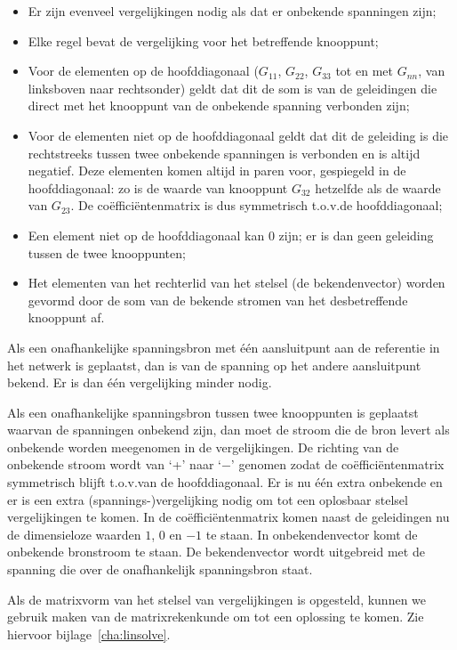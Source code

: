 \begin{itemize}
\item Er zijn evenveel vergelijkingen nodig als dat er onbekende spanningen zijn;
\item Elke regel bevat de vergelijking voor het betreffende knooppunt;
\item Voor de elementen op de hoofddiagonaal ($G_{11}$, $G_{22}$, $G_{33}$ tot en met $G_{nn}$, van linksboven naar rechtsonder) geldt dat dit de som is van de geleidingen die direct met het knooppunt van de onbekende spanning verbonden zijn;
\item Voor de elementen niet op de hoofddiagonaal geldt dat dit de geleiding is die rechtstreeks tussen twee onbekende spanningen is verbonden en is altijd negatief. Deze elementen komen altijd in paren voor, gespiegeld in de hoofddiagonaal: zo is de waarde van knooppunt $G_{32}$ hetzelfde als de waarde van $G_{23}$. De coëfficiëntenmatrix is dus symmetrisch t.o.v.\@ de hoofddiagonaal;
\item Een element niet op de hoofddiagonaal kan 0 zijn; er is dan geen geleiding tussen de twee knooppunten;
\item Het elementen van het rechterlid van het stelsel (de bekendenvector) worden gevormd door de som van de bekende stromen van het desbetreffende knooppunt af.
\end{itemize}

Als een onafhankelijke spanningsbron met één aansluitpunt aan de referentie in het netwerk is geplaatst, dan is van de spanning op het andere aansluitpunt bekend. Er is dan één vergelijking minder nodig.

Als een onafhankelijke spanningsbron tussen twee knooppunten is geplaatst waarvan de spanningen onbekend zijn, dan moet de stroom die de bron levert als onbekende worden meegenomen in de vergelijkingen. De richting van de onbekende stroom wordt van `+' naar `$-$' genomen zodat de coëfficiëntenmatrix symmetrisch blijft t.o.v.\@ van de hoofddiagonaal. Er is nu één extra onbekende en er is een extra (spannings-)vergelijking nodig om tot een oplosbaar stelsel vergelijkingen te komen. In de coëfficiëntenmatrix komen naast de geleidingen nu de dimensieloze waarden $1$, $0$ en $-1$ te staan. In onbekendenvector komt de onbekende bronstroom te staan. De bekendenvector wordt uitgebreid met de spanning die over de onafhankelijk spanningsbron staat.

Als de matrixvorm van het stelsel van vergelijkingen is opgesteld, kunnen we gebruik maken van de matrixrekenkunde om tot een oplossing te komen. Zie hiervoor bijlage~\ref{cha:linsolve}.



